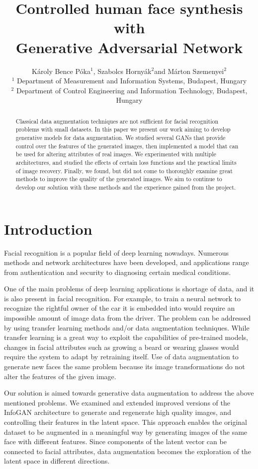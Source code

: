 \documentclass{egpubl}
\title{Controlled human face synthesis with\\
	 \space Generative Adversarial Network}
\author[Póka,Hornyák,Szemenyei]
	{Károly Bence Póka$^1$,
       Szabolcs Hornyák$^2$and
        Márton Szemenyei$^2$
        \\
        $^1$ Department of Measurement and Information Systems,
             Budapest, Hungary\\
        $^2$ Department of Control Engineering and Information Technology,
        Budapest, Hungary\\
       }
\begin{document}
\maketitle

\begin{abstract}
Classical data augmentation techniques are not sufficient for facial recognition problems with small datasets. In this paper we present our work aiming to develop generative models for data augmentation. We studied several GANs that provide control over the features of the generated images, then implemented a model that can be used for altering attributes of real images. We experimented with multiple architectures, and studied the effects of certain loss functions and the practical limits of image recovery. Finally, we found, but did not come to thoroughly examine great methods to improve the quality of the generated images. We aim to continue to develop our solution with these methods and the experience gained from the project.


\end{abstract}

\section{Introduction}

Facial recognition is a popular field of deep learning nowadays. Numerous methods and network architectures have been developed, and applications range from authentication and security to diagnosing certain medical conditions.

One of the main problems of deep learning applications is shortage of data, and it is also present in facial recognition. For example, to train a neural network to recognize the rightful owner of the car it is embedded into would require an impossible amount of image data from the driver. The problem can be addressed by using transfer learning methods and/or data augmentation techniques. While transfer learning is a great way to exploit the capabilities of pre-trained models, changes in facial attributes such as growing a beard or wearing glasses would require the system to adapt by retraining itself. Use of data augmentation to generate new faces the same problem because its image transformations do not alter the features of the given image.

Our solution is aimed towards generative data augmentation to address the above mentioned problems. We examined and extended improved versions of the InfoGAN architecture to generate and regenerate high quality images, and controlling their features in the latent space. This approach enables the original dataset to be augmented in a meaningful way by generating images of the same face with different features. Since components of the latent vector can be connected to facial attributes, data augmentation becomes the exploration of the latent space in different directions.
\end{document}

